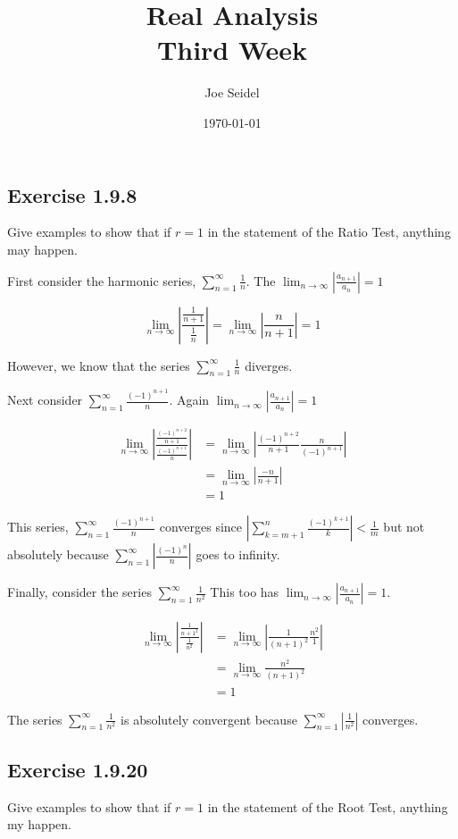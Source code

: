 \documentclass{tufte-book}
\title{Real Analysis\\Third Week }
\author{Joe Seidel}
\date{\today}
\theoremstyle{mytheoremstyle}
\theoremstyle{mylemstyle}
\theoremstyle{mydefstyle}
\begin{document}
\maketitle
{}
\newpage
{}


\subsection{Exercise 1.9.8}
Give examples to show that if $r=1$ in the statement of the Ratio Test, anything may happen.


First consider the harmonic series, $\sum_{n=1}^{\infty}\frac{1}{n}$. The $\lim_{n \to \infty}|\frac{a_{n+1}}{a_n}| = 1$

\[ \lim_{n \to \infty}|\frac{\frac{1}{n+1}}{\frac{1}{n}}| = \lim_{n \to \infty}|\frac{n}{n+1}| = 1 \]

However, we know that the series $\sum_{n=1}^{\infty}\frac{1}{n}$ diverges.

Next consider $\sum_{n=1}^{\infty}\frac{(-1)^{n+1}}{n}$.  Again $\lim_{n \to \infty}|\frac{a_{n+1}}{a_n}| = 1$

\begin{align*}
\lim_{n \to \infty}|\frac{\frac{(-1)^{n+2}}{n+1}}{\frac{(-1)^{n+1}}{n}}| &= \lim_{n \to \infty}|\frac{(-1)^{n+2}}{n+1} \frac{n}{(-1)^{n+1}}| \\
&= \lim_{n \to \infty}|\frac{-n}{n+1}|\\
&= 1
\end{align*}

This series, $\sum_{n=1}^{\infty}\frac{(-1)^{n+1}}{n}$ converges since $|\sum_{k=m+1}^{n}\frac{(-1)^{k+1}}{k}| < \frac{1}{m}$ but not absolutely because $\sum_{n=1}^{\infty}|\frac{(-1)^n}{n}|$ goes to infinity.

Finally, consider the series $\sum_{n=1}^{\infty} \frac{1}{n^2}$  This too has $\lim_{n \to \infty} |\frac{a_{n+1}}{a_n}| = 1$.

\begin{align*}
\lim_{n \to \infty} |\frac{\frac{1}{n+1^2}}{\frac{1}{n^2}}| &= \lim_{n \to \infty} |\frac{1}{(n+1)^2} \frac{n^2}{1}| \\
&= \lim_{n \to \infty}\frac{n^2}{(n+1)^2} \\
&= 1
\end{align*}

The series $\sum_{n=1}^{\infty} \frac{1}{n^2}$ is absolutely convergent because $\sum_{n=1}^{\infty}|\frac{1}{n^2}|$ converges.

\subsection{Exercise 1.9.20}
Give examples to show that if $r = 1$ in the statement of the Root Test, anything my happen.
\end{document}
